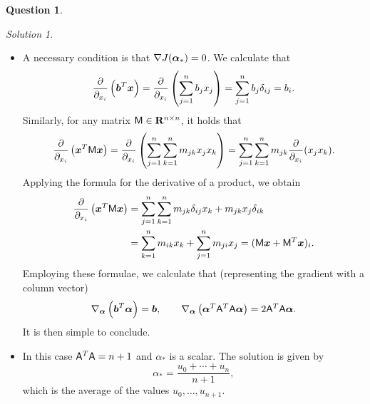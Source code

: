 \documentclass[11pt]{article}
\theoremstyle{definition}
\newtheorem{question}{Question}
\theoremstyle{remark}
\newtheorem*{solution}{Solution}
\begin{document}
\begin{question}
\begin{enumerate}
\begin{solution}
\begin{itemize}
                \item
                A necessary condition is that $\nabla J(\mathbf{\boldsymbol{\alpha}}_*) = 0$.
                We calculate that
                \[
                    \frac{\partial}{\partial_{x_i}} \left(\mathbf{\boldsymbol{b}}^T \mathbf{\boldsymbol{x}}\right)
                    = \frac{\partial}{\partial_{x_i}} \left(\sum_{j=1}^{n} b_j x_j\right) = \sum_{j=1}^{n} b_j \delta_{ij} = b_i.
                \]
                Similarly, for any matrix $\mathsf M \in \mathbf R^{n \times n}$,
                it holds that
                \[
                    \frac{\partial}{\partial_{x_i}} \left(\mathbf{\boldsymbol{x}}^T \mathsf M \mathbf{\boldsymbol{x}} \right)
                    = \frac{\partial}{\partial_{x_i}} \left(\sum_{j=1}^{n}\sum_{k=1}^{n} m_{jk} x_j x_k\right)
                    =  \sum_{j=1}^{n}\sum_{k=1}^{n} m_{jk} \frac{\partial}{\partial_{x_i}} (x_j x_k).
                \]
                Applying the formula for the derivative of a product,
                we obtain
                \begin{align*}
                    \frac{\partial}{\partial_{x_i}} \left(\mathbf{\boldsymbol{x}}^T \mathsf M \mathbf{\boldsymbol{x}} \right)
                    &= \sum_{j=1}^{n}\sum_{k=1}^{n} m_{jk} \delta_{ij} x_k + m_{jk} x_j \delta_{ik} \\
                    &= \sum_{k=1}^{n} m_{ik} x_k + \sum_{j=1}^{n} m_{ji} x_j
                    = (\mathsf M \mathbf{\boldsymbol{x}} + \mathsf M^T \mathbf{\boldsymbol{x}})_i.
                \end{align*}
                Employing these formulae,
                we calculate that (representing the gradient with a column vector)
                \[
                    \nabla_{\mathbf{\boldsymbol{\alpha}}} \left(\mathbf{\boldsymbol{b}}^T \mathbf{\boldsymbol{\alpha}}\right)
                    = \mathbf{\boldsymbol{b}}, \qquad \nabla_{\mathbf{\boldsymbol{\alpha}}} \left(\mathbf{\boldsymbol{\alpha}}^T \mathsf A^T \mathsf A \mathbf{\boldsymbol{\alpha}}\right)
                    = 2 \mathsf A^T \mathsf A \mathbf{\boldsymbol{\alpha}}.
                \]
                It is then simple to conclude.

                \item
                    In this case $\mathsf A^T \mathsf A = n+1$ and $\alpha_*$ is a scalar.
                    The solution is given by
                    \[
                        \alpha_* = \frac{u_0 + \dotsb + u_n}{n+1},
                    \]
                    which is the average of the values $u_0, \dotsc, u_{n+1}$.
            \end{itemize}
        \end{solution}
\end{enumerate}
\end{question}
\end{document}
